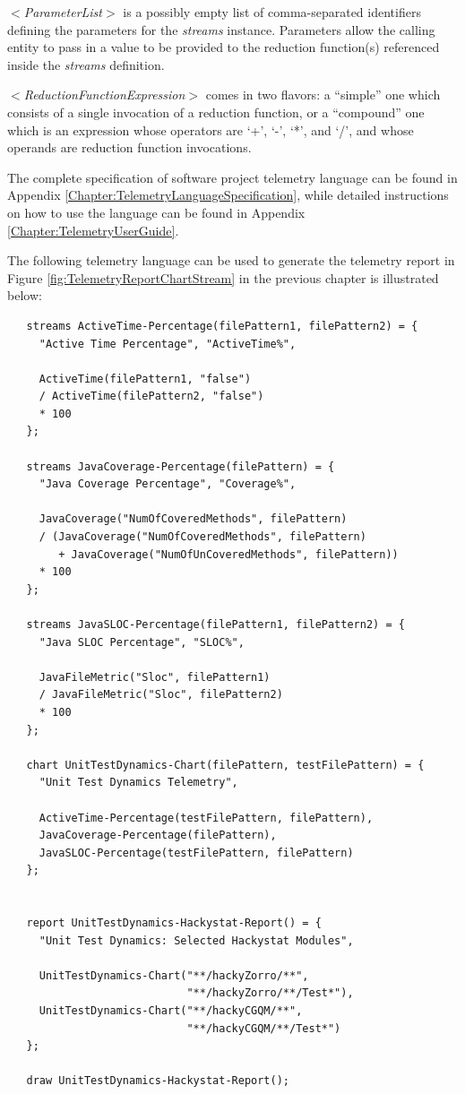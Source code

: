 \textit{$<$ParameterList$>$} is a possibly empty list of comma-separated identifiers defining the parameters for the \textit{streams} instance. Parameters allow the calling entity to pass in a value to be provided to the reduction function(s) referenced inside the \textit{streams} definition.

\textit{$<$ReductionFunctionExpression$>$} comes in two flavors: a ``simple'' one which consists of a single invocation of a reduction function, or a ``compound'' one which is an expression whose operators are `+', `-', `*', and `/', and whose operands are reduction function invocations. 

The complete specification of software project telemetry language can be found in Appendix \ref{Chapter:TelemetryLanguageSpecification}, while detailed instructions on how to use the language can be found in Appendix \ref{Chapter:TelemetryUserGuide}. 

The following telemetry language can be used to generate the telemetry report in Figure \ref{fig:TelemetryReportChartStream} in the previous chapter is illustrated below:



\begin{verbatim}
   streams ActiveTime-Percentage(filePattern1, filePattern2) = {
     "Active Time Percentage", "ActiveTime%",
     
     ActiveTime(filePattern1, "false") 
     / ActiveTime(filePattern2, "false") 
     * 100
   };

   streams JavaCoverage-Percentage(filePattern) = {
     "Java Coverage Percentage", "Coverage%",
     
     JavaCoverage("NumOfCoveredMethods", filePattern) 
     / (JavaCoverage("NumOfCoveredMethods", filePattern) 
        + JavaCoverage("NumOfUnCoveredMethods", filePattern))
     * 100
   };
   
   streams JavaSLOC-Percentage(filePattern1, filePattern2) = {
     "Java SLOC Percentage", "SLOC%",
     
     JavaFileMetric("Sloc", filePattern1)
     / JavaFileMetric("Sloc", filePattern2)
     * 100
   };

   chart UnitTestDynamics-Chart(filePattern, testFilePattern) = {
     "Unit Test Dynamics Telemetry",
     
     ActiveTime-Percentage(testFilePattern, filePattern),
     JavaCoverage-Percentage(filePattern),
     JavaSLOC-Percentage(testFilePattern, filePattern)
   };


   report UnitTestDynamics-Hackystat-Report() = {
     "Unit Test Dynamics: Selected Hackystat Modules", 
     
     UnitTestDynamics-Chart("**/hackyZorro/**", 
                            "**/hackyZorro/**/Test*"),
     UnitTestDynamics-Chart("**/hackyCGQM/**", 
                            "**/hackyCGQM/**/Test*")
   };

   draw UnitTestDynamics-Hackystat-Report();
\end{verbatim}


